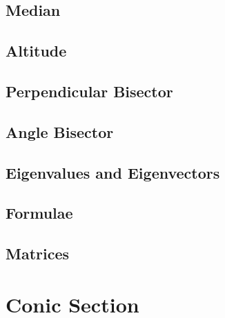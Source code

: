 \documentclass[journal]{IEEEtran}
\begin{document}
\subsection{Median}

\subsection{Altitude}

\subsection{Perpendicular Bisector}

\subsection{Angle Bisector}

\subsection{Eigenvalues and Eigenvectors}

\subsection{Formulae}

\subsection{Matrices}

\newpage
\section{Conic Section}

\end{document}
